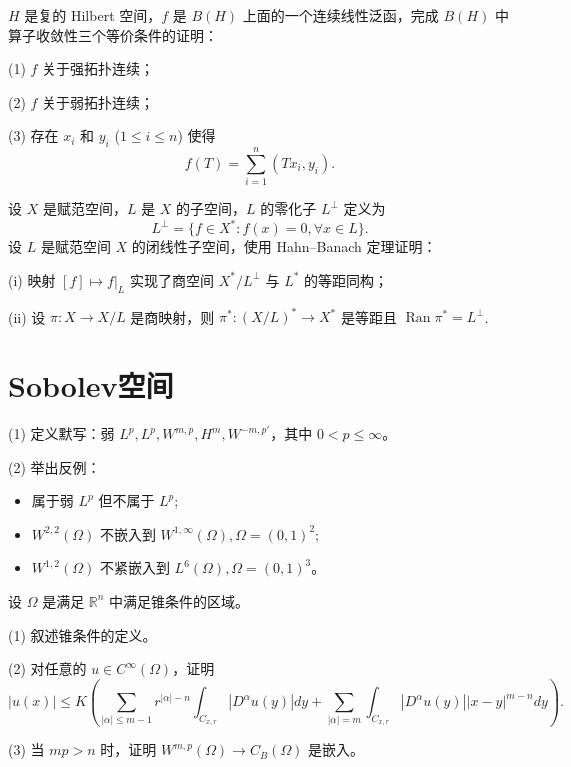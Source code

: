 \begin{problem}
\( H \) 是复的 Hilbert 空间，\( f \) 是 \( B(H) \) 上面的一个连续线性泛函，完成 \( B(H) \) 中算子收敛性三个等价条件的证明：

(1) \( f \) 关于强拓扑连续；

(2) \( f \) 关于弱拓扑连续；

(3) 存在 \( x_i \) 和 \( y_i \) (\( 1 \leq i \leq n \)) 使得
\[
f(T) = \sum_{i=1}^n (Tx_i, y_i).
\]
\end{problem}

\begin{problem}
设 \( X \) 是赋范空间，\( L \) 是 \( X \) 的子空间，\( L \) 的零化子 \( L^\perp \) 定义为
\[
L^\perp = \{ f \in X^* : f(x) = 0, \forall x \in L \}.
\]
设 \( L \) 是赋范空间 \( X \) 的闭线性子空间，使用 Hahn--Banach 定理证明：

(i) 映射 \([f] \mapsto f|_L\) 实现了商空间 \( X^* / L^\perp \) 与 \( L^* \) 的等距同构；

(ii) 设 \(\pi : X \to X/L\) 是商映射，则 \(\pi^* : (X/L)^* \to X^*\) 是等距且 \(\operatorname{Ran}\pi^* = L^\perp\).
\end{problem}

\section{Sobolev空间}

\begin{problem}
(1) 定义默写：弱 \( L^p, L^p, W^{m,p}, H^m, W^{-m,p'} \)，其中 \( 0 < p \leq \infty \)。  

(2) 举出反例：
\begin{itemize}
\item 属于弱 \( L^p \) 但不属于 \( L^p \);
\item \( W^{2,2}(\Omega) \) 不嵌入到 \( W^{1,\infty}(\Omega), \Omega = (0,1)^2 \);
\item \( W^{1,2}(\Omega) \) 不紧嵌入到 \( L^6(\Omega), \Omega = (0,1)^3 \)。
\end{itemize}
\end{problem}

\begin{problem}
设 \(\Omega\) 是满足 \( \mathbb{R}^n \) 中满足锥条件的区域。

(1) 叙述锥条件的定义。

(2) 对任意的 \( u \in C^\infty(\Omega) \)，证明
\[
|u(x)| \leq K \left( \sum_{|\alpha| \leq m-1} r^{|\alpha|-n} \int_{C_{x,r}} |D^\alpha u(y)| dy + \sum_{|\alpha|=m} \int_{C_{x,r}} |D^\alpha u(y)| |x-y|^{m-n} dy \right).
\]

(3) 当 \( mp > n \) 时，证明 \( W^{m,p}(\Omega) \to C_B(\Omega) \) 是嵌入。
\end{problem}

